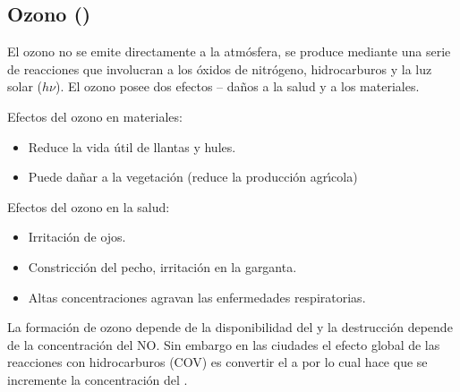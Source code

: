 \subsection{Ozono () \label{o3_salud}}
El ozono no se emite directamente a la atm\'osfera, se produce mediante una serie de reacciones que involucran a los \'oxidos de nitr\'ogeno, hidrocarburos y la luz solar ($h\nu$). El ozono posee dos efectos -- da\~nos a la salud y a los materiales.

Efectos del ozono en materiales:
\begin{itemize}
\item Reduce la vida \'util de llantas y hules.
\item Puede da\~nar a la vegetaci\'on (reduce la producci\'on agr\'{\i}cola)
\end{itemize}
Efectos del ozono en la salud:
\begin{itemize}
\item Irritaci\'on de ojos.
\item Constricci\'on del pecho, irritaci\'on en la garganta.
\item Altas concentraciones agravan las enfermedades respiratorias.
\end{itemize}
%
%
La  formaci\'on de ozono depende de la disponibilidad del   y la destrucci\'on depende de la concentraci\'on del NO. Sin embargo en las ciudades el efecto global de las reacciones con hidrocarburos (COV) es convertir el  a  por lo cual hace que se incremente la concentración del .

